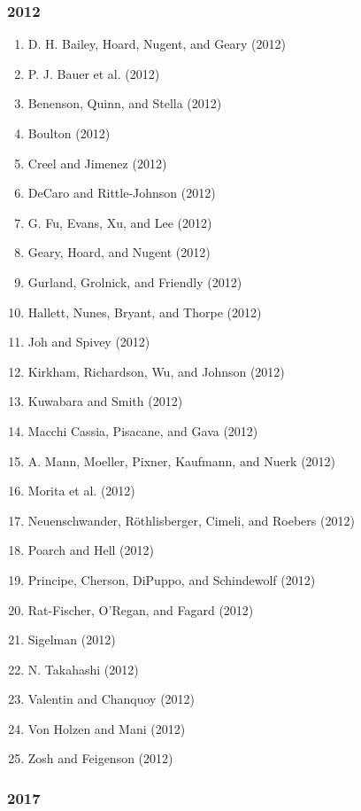 \documentclass[english,man]{apa6}
\providecommand{\tightlist}{%
  \setlength{\itemsep}{0pt}\setlength{\parskip}{0pt}}
\theoremstyle{definition}
\theoremstyle{definition}
\theoremstyle{definition}
\theoremstyle{remark}
\begin{document}
\subsubsection{2012}\label{section-12}

\begin{enumerate}
\def\labelenumi{\arabic{enumi})}
\tightlist
\item
  D. H. Bailey, Hoard, Nugent, and Geary (2012)
\item
  P. J. Bauer et al. (2012)
\item
  Benenson, Quinn, and Stella (2012)
\item
  Boulton (2012)
\item
  Creel and Jimenez (2012)
\item
  DeCaro and Rittle-Johnson (2012)
\item
  G. Fu, Evans, Xu, and Lee (2012)
\item
  Geary, Hoard, and Nugent (2012)
\item
  Gurland, Grolnick, and Friendly (2012)
\item
  Hallett, Nunes, Bryant, and Thorpe (2012)
\item
  Joh and Spivey (2012)
\item
  Kirkham, Richardson, Wu, and Johnson (2012)
\item
  Kuwabara and Smith (2012)
\item
  Macchi Cassia, Pisacane, and Gava (2012)
\item
  A. Mann, Moeller, Pixner, Kaufmann, and Nuerk (2012)
\item
  Morita et al. (2012)
\item
  Neuenschwander, Röthlisberger, Cimeli, and Roebers (2012)
\item
  Poarch and Hell (2012)
\item
  Principe, Cherson, DiPuppo, and Schindewolf (2012)
\item
  Rat-Fischer, O'Regan, and Fagard (2012)
\item
  Sigelman (2012)
\item
  N. Takahashi (2012)
\item
  Valentin and Chanquoy (2012)
\item
  Von Holzen and Mani (2012)
\item
  Zosh and Feigenson (2012)
\end{enumerate}

\subsubsection{2017}\label{section-13}
\end{document}
